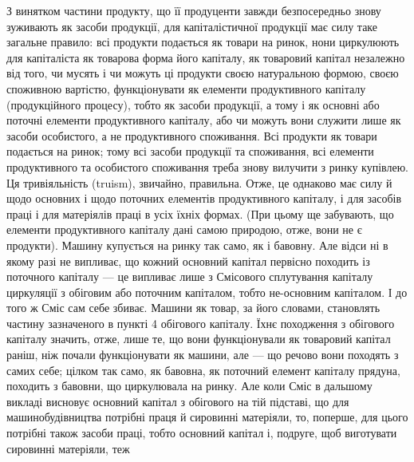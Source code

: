 З винятком частини продукту, що її продуценти завжди безпосередньо
знову зуживають як засоби продукції, для капіталістичної продукції
має силу таке загальне правило: всі продукти подається як товари на ринок,
нони циркулюють для капіталіста як товарова форма його капіталу, як товаровий
капітал незалежно від того, чи мусять і чи можуть ці продукти
своєю натуральною формою, своєю споживною вартістю, функціонувати як
елементи продуктивного капіталу (продукційного процесу), тобто як засоби
продукції, а тому і як основні або поточні елементи продуктивного капіталу,
або чи можуть вони служити лише як засоби особистого, а не продуктивного
споживання. Всі продукти як товари подається на ринок;
тому всі засоби продукції та споживання, всі елементи продуктивного та
особистого споживання треба знову вилучити з ринку купівлею. Ця тривіяльність
(truism), звичайно, правильна. Отже, це однаково має силу й
щодо основних і щодо поточних елементів продуктивного капіталу, і
для засобів праці і для матеріялів праці в усіх їхніх формах. (При цьому
ще забувають, що елементи продуктивного капіталу дані самою природою,
отже, вони не є продукти). Машину купується на ринку так само,
як і бавовну. Але відси ні в якому разі не випливає, що кожний основний
капітал первісно походить із поточного капіталу — це випливає лише
з Смісового сплутування капіталу циркуляції з обіговим або поточним
капіталом, тобто не-основним капіталом. І до того ж Сміс сам себе збиває.
Машини як товар, за його словами, становлять частину зазначеного
в пункті 4 обігового капіталу. Їхнє походження з обігового капіталу значить,
отже, лише те, що вони функціонували як товаровий капітал раніш,
ніж почали функціонувати як машини, але — що речово вони походять
з самих себе; цілком так само, як бавовна, як поточний елемент капіталу
прядуна, походить з бавовни, що циркулювала на ринку. Але коли
Сміс в дальшому викладі висновує основний капітал з обігового на
тій підставі, що для машинобудівництва потрібні праця й сировинні матеріяли,
то, поперше, для цього потрібні також засоби праці, тобто основний
капітал і, подруге, щоб виготувати сировинні матеріяли, теж
\parbreak{}  %
